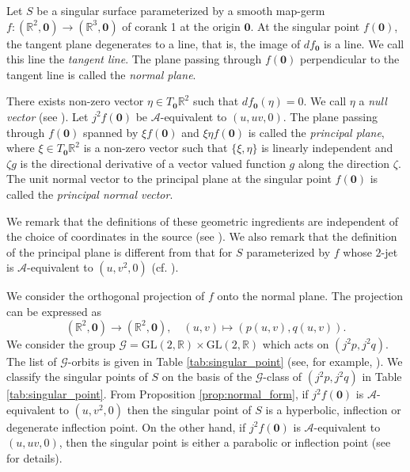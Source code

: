 \documentclass[12pt]{amsart}
\theoremstyle{plain}
\theoremstyle{definition}
\newcommand{\R}{\mathbb{R}}
\begin{document}
Let $S$ be a singular surface parameterized by a smooth map-germ $f\colon(\R^2,\bm{0})\to(\R^3,\bm{0})$ of corank 1 at the origin $\bm{0}$. 
At the singular point $f(\bm{0})$, the tangent plane degenerates to a line, that is, the image of $df_{\bm{0}}$ is a line.  
We call this line the {\it tangent line}.
The plane passing through $f(\bm{0})$ perpendicular to the tangent line is called the {\it normal plane}.
 
There exists non-zero vector $\eta\in T_{\bm{0}}\R^2$ such that $df_{\bm{0}}(\eta)=0$.
We call $\eta$ a {\it null vector} (see \cite{KRSUY2005}). 
Let $j^2 f(\bm{0})$ be $\mathcal{A}$-equivalent to $(u,u v,0)$.
The plane passing through $f(\bm{0})$ spanned by $\xi f(\bm{0})$ and $\xi\eta f(\bm{0})$ is called the {\it principal plane},  where $\xi \in T_{\bm{0}}\R^2$ is a non-zero vector such that $\{\xi,\eta\}$ is linearly independent and $\zeta g$ is the directional derivative of a vector valued function $g$ along the direction $\zeta$.
The unit normal vector to the principal plane at the singular point $f(\bm{0})$ is called the \textit{principal normal vector}.

We remark that the definitions of these geometric ingredients are independent of the choice of coordinates in the source (see \cite{HHNUY2014}).
We also remark that the definition of the principal plane is different from that for $S$ parameterized by $f$ whose $2$-jet is $\mathcal{A}$-equivalent to $(u,v^2,0)$ (cf. \cite{FH2025}).

We consider the orthogonal projection of $f$ onto the normal plane.
The projection can be expressed as
\[
(\R^2,\bm{0})\to(\R^2,\bm{0}),\quad(u,v)\mapsto(p(u,v),q(u,v)).
\]
We consider the group $\mathcal{G} = \mathrm{GL}(2,\R) \times \mathrm{GL}(2,\R)$ which acts on $(j^2 p, j^2 q)$. 
The list of $\mathcal{G}$-orbits is given in Table \ref{tab:singular_point} (see, for example, \cite{Gibson1979}). 
We classify the singular points of $S$ on the basis of the $\mathcal{G}$-class of $(j^2 p, j^2 q)$ in Table \ref{tab:singular_point}.
From Proposition \ref{prop:normal_form}, if $j^2f(\bm{0})$ is $\mathcal{A}$-equivalent to $(u,v^2,0)$ then the singular point of $S$ is a hyperbolic, inflection or degenerate inflection point. 
On the other hand, if $j^2f(\bm{0})$ is $\mathcal{A}$-equivalent to $(u,u
v,0)$, then the singular point is either a parabolic or inflection point (see \cite{O-ST2015} for details). 
\end{document}
